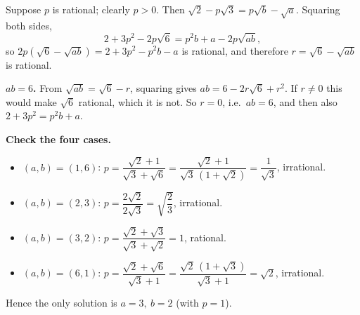 Suppose $p$ is rational; clearly $p>0$. Then $\sqrt2-p\sqrt3=p\sqrt b-\sqrt a$. Squaring both sides,
\[
2+3p^2-2p\sqrt6=p^2b+a-2p\sqrt{ab},
\]
so $2p\left(\sqrt6-\sqrt{ab}\right)=2+3p^2-p^2b-a$ is rational, and therefore $r=\sqrt6-\sqrt{ab}$ is rational.

\textbf{$ab=6$.} From $\sqrt{ab}=\sqrt6-r$, squaring gives $ab=6-2r\sqrt6+r^2$. If $r\ne0$ this would make $\sqrt6$ rational, which it is not. So $r=0$, i.e.\ $ab=6$, and then also $2+3p^2=p^2b+a$.

\textbf{Check the four cases.}
\begin{itemize}
\item $(a,b)=(1,6)$: $p=\dfrac{\sqrt2+1}{\sqrt3+\sqrt6}=\dfrac{\sqrt2+1}{\sqrt3\,(1+\sqrt2)}=\dfrac{1}{\sqrt3}$, irrational.
\item $(a,b)=(2,3)$: $p=\dfrac{2\sqrt2}{2\sqrt3}=\sqrt{\dfrac{2}{3}}$, irrational.
\item $(a,b)=(3,2)$: $p=\dfrac{\sqrt2+\sqrt3}{\sqrt3+\sqrt2}=1$, rational.
\item $(a,b)=(6,1)$: $p=\dfrac{\sqrt2+\sqrt6}{\sqrt3+1}=\dfrac{\sqrt2\,(1+\sqrt3)}{\sqrt3+1}=\sqrt2$, irrational.
\end{itemize}
Hence the only solution is $\boxed{a=3,\ b=2}$ (with $p=1$).
